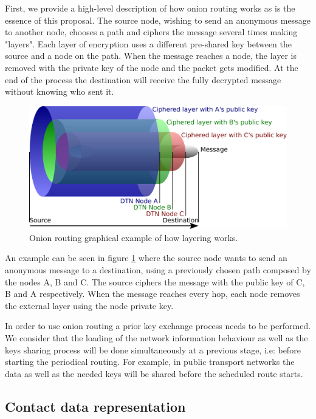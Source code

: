 
First, we provide a high-level description of how onion routing works as is the essence of this proposal. The source node, wishing to send an anonymous message to another node, chooses a path and ciphers the message several times making "layers". Each layer of encryption uses a different pre-shared key between the source and a node on the path. When the message reaches a node, the layer is removed with the private key of the node and the packet gets modified. At the end of the process the destination will receive the fully decrypted message without knowing who sent it.

\begin{figure}[hbt]
  \centering
  \includegraphics[scale=0.35]{imgs/onion}
  \caption{Onion routing graphical example of how layering works.}
  \label{fig:dtn-example}
\end{figure}

An example can be seen in figure \ref{fig:dtn-example} where the source node wants to send an anonymous message to a destination, using a previously chosen path composed by the nodes A, B and C. The source ciphers the message with the public key of C, B and A respectively. When the message reaches every hop, each node removes the external layer using the node private key.

In order to use onion routing a prior key exchange process needs to be performed. We consider that the loading of the network information behaviour as well as the keys sharing process will be done simultaneously at a previous stage, i.e: before starting the periodical routing. For example, in public transport networks the data as well as the needed keys will be shared before the scheduled route starts.

\subsection{Contact data representation}

